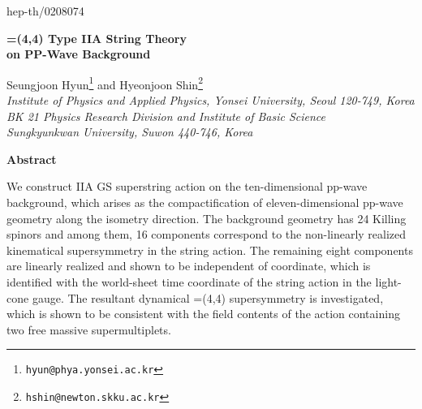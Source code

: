 \documentclass[a4paper,12pt]{article}
\begin{document}
\renewcommand{\thefootnote}{\fnsymbol{footnote}}

\begin{titlepage}
\hfill{hep-th/0208074}
\vspace{15mm}
\baselineskip 8mm

\begin{center}
{\LARGE \bf {}\coordHE{}=(4,4) Type IIA String Theory \\
on PP-Wave Background }
\end{center}
\baselineskip 6mm
\vspace{10mm}
\begin{center}
Seungjoon Hyun\coordHE{}\footnote{\tt hyun@phya.yonsei.ac.kr} and
Hyeonjoon Shin\coordHE{}\footnote{\tt hshin@newton.skku.ac.kr} \\[5mm]
{\it
{}\coordHE{}Institute of Physics and Applied Physics, Yonsei University,
Seoul 120-749, Korea \\
\coordHE{} BK 21 Physics Research Division and Institute of Basic Science \\
Sungkyunkwan University, Suwon 440-746, Korea}
\end{center}

\thispagestyle{empty}


\vfill

\begin{center}
{\bf Abstract}
\end{center}
\noindent 
We construct IIA GS superstring action on the ten-dimensional pp-wave
background, which arises as the compactification of eleven-dimensional
pp-wave geometry along the isometry direction. The background geometry
has 24 Killing spinors and among them, 16 components correspond to the
non-linearly realized kinematical supersymmetry in the string
action. The remaining eight components are linearly realized and shown
to be independent of \coordHE{} coordinate, which is identified with the
world-sheet time coordinate of the string action in the light-cone
gauge. The resultant dynamical \coordHE{}=(4,4) supersymmetry is
investigated, which is shown to be consistent with the field contents
of the action containing two free massive supermultiplets.
\vspace{20mm}
\end{titlepage}

\baselineskip 6.5mm
\renewcommand{\thefootnote}{\arabic{footnote}}
\setcounter{footnote}{0}
\end{document}
